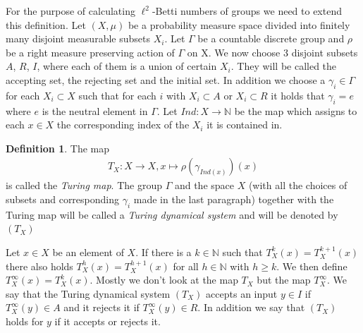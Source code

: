 \documentclass[12pt,a4paper]{scrartcl}
\theoremstyle{plain}
\theoremstyle{definition}
\newtheorem{Definition}[Theorem]{Definition}
\numberwithin{equation}{section}
\newcommand{\N}{\mathbb{N}} %
\newcommand{\2}{\mathbb{Z} / 2 \mathbb{Z}}
\newcommand{\1}{\bar{1}}
\newcommand{\0}{\bar{0}}
\begin{document}
For the purpose of calculating $\ell^2$-Betti numbers of groups we need to extend this definition. Let $(X, \mu)$ be a probability measure space divided into finitely many disjoint measurable subsets $X_i$. Let $\Gamma$ be a countable discrete group and $\rho$ be a right measure preserving action of $\Gamma$ on X.
We now choose 3 disjoint subsets $A$, $R$, $I$, where each of them is a union of certain $X_i$. They will be called the accepting set, the rejecting set and the initial set. In addition we choose a $\gamma_i \in \Gamma$ for each $X_i \subset X$ such that for each $i$ with $X_i \subset A$ or $X_i \subset R$ it holds that $\gamma_i = e$ where $e$ is the neutral element in $\Gamma$. 
Let $Ind: X \to \N$ be the map which assigns to each $x \in X$ the corresponding index of the $X_i$ it is contained in.
\begin{Definition}
	 The map 
	 \begin{align*}
	 T_X:X \to X, x \mapsto \rho(\gamma_{Ind(x)})(x)
	 \end{align*}
	 is called the \emph{Turing map}.
	 The group $\Gamma$ and the space $X$ (with all the choices of subsets and corresponding $\gamma_i$ made in the last paragraph) together with the Turing map will be called a \emph{Turing dynamical system} and will be denoted by $(T_X)$
\end{Definition}
Let $x \in X$ be an element of $X$. If there is a $k \in \N$ such that $T_X^k(x) = T_X^{k + 1}(x)$ there also holds $T_X^h(x) = T_X^{h + 1}(x)$ for all $h \in \N$ with $h \geq k$. We then define $T_X^\infty (x) = T_X^k(x)$. Mostly we don't look at the map $T_X$ but the map $T_X^\infty$. We say that the Turing dynamical system $(T_X)$ accepts an input $y \in I$ if $T_X^\infty(y) \in A$ and it rejects it if $T_X^\infty(y) \in R$. In addition we say that $(T_X)$ holds for $y$ if it accepts or rejects it.
\end{document}
